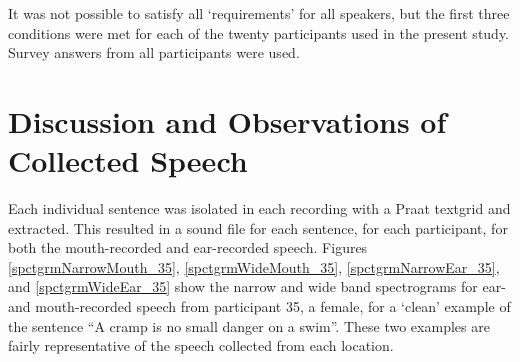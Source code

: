 It was not possible to satisfy all `requirements' for all speakers, but the first three conditions were met for each of the twenty participants used in the present study.  Survey answers from all participants were used.




\section{Discussion and Observations of Collected Speech}\label{chap2:observations}

Each individual sentence was isolated in each recording with a Praat textgrid and extracted.  This resulted in a sound file for each sentence, for each participant, for both the mouth-recorded and ear-recorded speech.  Figures \ref{spctgrmNarrowMouth_35}, \ref{spctgrmWideMouth_35}, \ref{spctgrmNarrowEar_35}, and \ref{spctgrmWideEar_35} show the narrow and wide band spectrograms for ear- and mouth-recorded speech from participant 35, a female, for a `clean' example of the sentence ``A cramp is no small danger on a swim''.  These two examples are fairly representative of the speech collected from each location.

